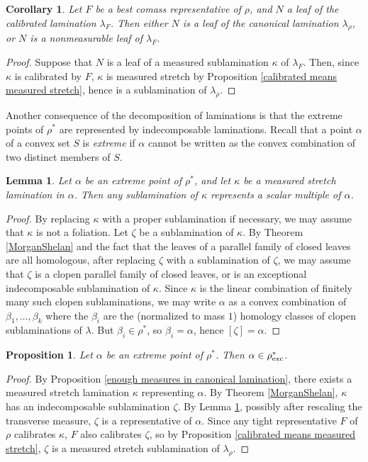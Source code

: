 \documentclass[reqno,11pt]{amsart}
\newcommand{\dfn}[1]{\emph{#1}\index{#1}}
\newtheorem{lemma}[theorem]{Lemma}
\newtheorem{proposition}[theorem]{Proposition}
\newtheorem{corollary}[theorem]{Corollary}
\theoremstyle{definition}
\numberwithin{equation}{section}
\begin{document}
\begin{corollary}
Let $F$ be a best comass representative of $\rho$, and $N$ a leaf of the calibrated lamination $\lambda_F$.
Then either $N$ is a leaf of the canonical lamination $\lambda_\rho$, or $N$ is a nonmeasurable leaf of $\lambda_F$.
\end{corollary}
\begin{proof}
Suppose that $N$ is a leaf of a measured sublamination $\kappa$ of $\lambda_F$.
Then, since $\kappa$ is calibrated by $F$, $\kappa$ is measured stretch by Proposition \ref{calibrated means measured stretch}, hence is a sublamination of $\lambda_\rho$.
\end{proof}

Another consequence of the decomposition of laminations is that the extreme points of $\rho^*$ are represented by indecomposable laminations.
Recall that a point $\alpha$ of a convex set $S$ is \dfn{extreme} if $\alpha$ cannot be written as the convex combination of two distinct members of $S$.

\begin{lemma}\label{extreme points are closed under sublaminations}
Let $\alpha$ be an extreme point of $\rho^*$, and let $\kappa$ be a measured stretch lamination in $\alpha$.
Then any sublamination of $\kappa$ represents a scalar multiple of $\alpha$.
\end{lemma}
\begin{proof}
By replacing $\kappa$ with a proper sublamination if necessary, we may assume that $\kappa$ is not a foliation.
Let $\zeta$ be a sublamination of $\kappa$.
By Theorem \ref{MorganShelan} and the fact that the leaves of a parallel family of closed leaves are all homologous, after replacing $\zeta$ with a sublamination of $\zeta$, we may assume that $\zeta$ is a clopen parallel family of closed leaves, or is an exceptional indecomposable sublamination of $\kappa$.
Since $\kappa$ is the linear combination of finitely many such clopen sublaminations, we may write $\alpha$ as a convex combination of $\beta_1, \dots, \beta_k$ where the $\beta_i$ are the (normalized to mass $1$) homology classes of clopen sublaminations of $\lambda$.
But $\beta_i \in \rho^*$, so $\beta_i = \alpha$, hence $[\zeta] = \alpha$.
\end{proof}

\begin{proposition}\label{extreme points are indecomposable}
Let $\alpha$ be an extreme point of $\rho^*$. Then $\alpha \in \rho^*_{\rm exc}$.
\end{proposition}
\begin{proof}
By Proposition \ref{enough measures in canonical lamination}, there exists a measured stretch lamination $\kappa$ representing $\alpha$.
By Theorem \ref{MorganShelan}, $\kappa$ has an indecomposable sublamination $\zeta$.
By Lemma \ref{extreme points are closed under sublaminations}, possibly after rescaling the transverse measure, $\zeta$ is a representative of $\alpha$.
Since any tight representative $F$ of $\rho$ calibrates $\kappa$, $F$ also calibrates $\zeta$, so by Proposition \ref{calibrated means measured stretch}, $\zeta$ is a measured stretch sublamination of $\lambda_\rho$.
\end{proof}
\end{document}

